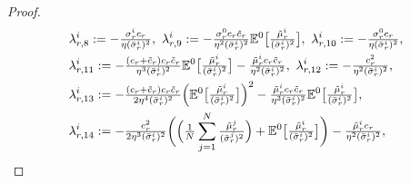\documentclass[10pt,a4paper]{article}
\theoremstyle{plain}
\theoremstyle{definition}
\numberwithin{equation}{section}
\begin{document}
\begin{proof}
\begin{align}
&\lambda_{r,8}^{i} := -\tfrac{\sigma_{r}^{i}c_{r}}{\eta(\bar{\sigma}_{r}^{i})^{2}}, \  
\lambda_{r,9}^{i} := -\tfrac{\sigma_{r}^{0}c_{r}\tilde{c}_{r}}{\eta^{2}(\bar{\sigma}_{r}^{i})^{2}}\mathbb{E}^{0}\bigl[\tfrac{\tilde{\mu}_{r}^{i}}{(\bar{\sigma}_{r}^{i})^{2}}\bigr], \ 
\lambda_{r,10}^{i} := -\tfrac{\sigma_{r}^{0}c_{r}}{\eta(\bar{\sigma}_{r}^{i})^{2}}, 
\label{equ:def_lambda8} \\
&\lambda_{r,11}^{i} := -\tfrac{(c_{r}+\tilde{c}_{r})c_{r}\tilde{c}_{r}}{\eta^{3}(\bar{\sigma}_{r}^{i})^{2}}\mathbb{E}^{0}\bigl[\tfrac{\tilde{\mu}_{r}^{i}}{(\bar{\sigma}_{r}^{i})^{2}}\bigr] - \tfrac{\tilde{\mu}_{r}^{i}c_{r}\tilde{c}_{r}}{\eta^{2}(\bar{\sigma}_{r}^{i})^{2}}, \ 
\lambda_{r,12}^{i} := -\tfrac{c_{r}^{2}}{\eta^{2}(\bar{\sigma}_{r}^{i})^{2}},
\label{equ:def_lambda11} \\
&\lambda_{r,13}^{i} := -\tfrac{(c_{r}+\tilde{c}_{r})c_{r}\tilde{c}_{r}}{2\eta^{4}(\bar{\sigma}_{r}^{i})^{2}}\Bigl(\mathbb{E}^{0}\bigl[\tfrac{\tilde{\mu}_{r}^{i}}{(\bar{\sigma}_{r}^{i})^{2}}\bigr]\Bigr)^{2} - \tfrac{\tilde{\mu}_{r}^{i}c_{r}\tilde{c}_{r}}{\eta^{3}(\bar{\sigma}_{r}^{i})^{2}}\mathbb{E}^{0}\bigl[\tfrac{\tilde{\mu}_{r}^{i}}{(\bar{\sigma}_{r}^{i})^{2}}\bigr], \label{equ:def_lambda13} \\
&\lambda_{r,14}^{i} := -\tfrac{c_{r}^{2}}{2\eta^{3}(\bar{\sigma}_{r}^{i})^{2}}\biggl(\Bigl(\tfrac{1}{N}\sum_{j=1}^{N}\tfrac{\tilde{\mu}_{r}^{j}}{(\bar{\sigma}_{r}^{j})^{2}}\Bigr)+\mathbb{E}^{0}\bigl[\tfrac{\tilde{\mu}_{r}^{i}}{(\bar{\sigma}_{r}^{i})^{2}}\bigr]\biggr) - \tfrac{\tilde{\mu}_{r}^{i}c_{r}}{\eta^{2}(\bar{\sigma}_{r}^{i})^{2}},

\end{align}
\end{proof}
\end{document}
